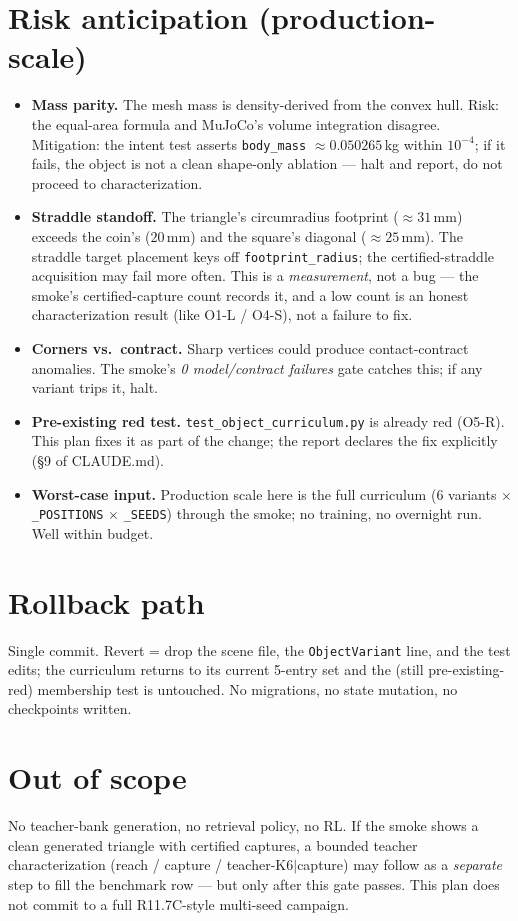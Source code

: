 \documentclass[11pt]{article}
\begin{document}
\section{Risk anticipation (production-scale)}
\begin{itemize}[nosep]
  \item \textbf{Mass parity.} The mesh mass is density-derived from the convex hull. Risk: the
    equal-area formula and MuJoCo's volume integration disagree. Mitigation: the intent test asserts
    \texttt{body\_mass} $\approx 0.050265$\,kg within $10^{-4}$; if it fails, the object is not a clean
    shape-only ablation --- halt and report, do not proceed to characterization.
  \item \textbf{Straddle standoff.} The triangle's circumradius footprint ($\approx 31$\,mm) exceeds
    the coin's ($20$\,mm) and the square's diagonal ($\approx 25$\,mm). The straddle target placement
    keys off \texttt{footprint\_radius}; the certified-straddle acquisition may fail more often. This is
    a \emph{measurement}, not a bug --- the smoke's certified-capture count records it, and a low count
    is an honest characterization result (like O1-L / O4-S), not a failure to fix.
  \item \textbf{Corners vs.\ contract.} Sharp vertices could produce contact-contract anomalies. The
    smoke's \emph{0 model/contract failures} gate catches this; if any variant trips it, halt.
  \item \textbf{Pre-existing red test.} \texttt{test\_object\_curriculum.py} is already red (O5-R). This
    plan fixes it as part of the change; the report declares the fix explicitly (\S9 of CLAUDE.md).
  \item \textbf{Worst-case input.} Production scale here is the full curriculum ($6$ variants
    $\times$ \texttt{\_POSITIONS} $\times$ \texttt{\_SEEDS}) through the smoke; no training, no overnight
    run. Well within budget.
\end{itemize}

\section{Rollback path}
Single commit. Revert = drop the scene file, the \texttt{ObjectVariant} line, and the test edits; the
curriculum returns to its current 5-entry set and the (still pre-existing-red) membership test is
untouched. No migrations, no state mutation, no checkpoints written.

\section{Out of scope}
No teacher-bank generation, no retrieval policy, no RL. If the smoke shows a clean generated triangle
with certified captures, a bounded teacher characterization (reach / capture / teacher-K6$\mid$capture)
may follow as a \emph{separate} step to fill the benchmark row --- but only after this gate passes.
This plan does not commit to a full R11.7C-style multi-seed campaign.
\end{document}

